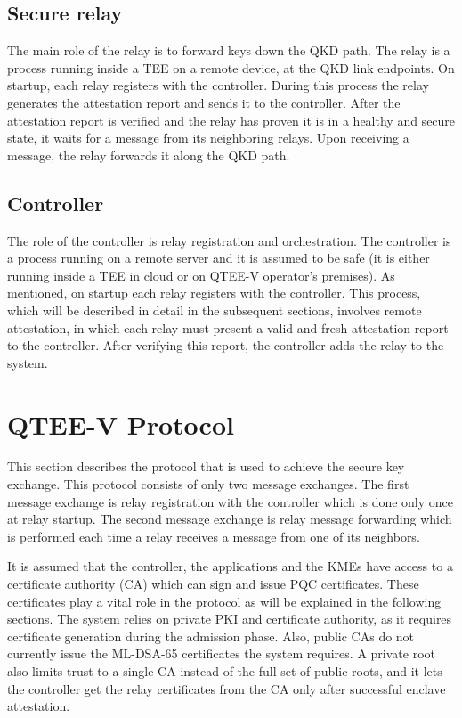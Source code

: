\documentclass[futureinternet,article,submit,moreauthors]{Definitions/mdpi}
\begin{document}
\subsection{Secure relay}

The main role of the relay is to forward keys down the QKD path. The relay is a process running inside a TEE on a remote device, at the QKD link endpoints. On startup, each relay registers with the controller. During this process the relay generates the attestation report and sends it to the controller. After the attestation report is verified and the relay has proven it is in a healthy and secure state, it waits for a message from its neighboring relays. Upon receiving a message, the relay  forwards it along the QKD path.

\subsection{Controller}

The role of the controller is relay registration and orchestration. The controller is a process running on a remote server and it is assumed to be safe (it is either running inside a TEE in cloud or on QTEE-V operator's premises). As mentioned, on startup each relay registers with the controller. This process, which will be described in detail in the subsequent sections, involves remote attestation, in which each relay must present a valid and fresh attestation report to the controller. After verifying this report, the controller adds the relay to the system.

\section{QTEE-V Protocol}

This section describes the protocol that is used to achieve the secure key exchange. This protocol consists of only two message exchanges. The first message exchange is relay registration with the controller which is done only once at relay startup. The second message exchange is relay message forwarding which is performed each time a relay receives a message from one of its neighbors.

It is assumed that the controller, the applications and the KMEs have access to a certificate authority (CA) which can sign and issue PQC certificates. These certificates play a vital role in the protocol as will be explained in the following sections. The system relies on private PKI and certificate authority, as it requires certificate generation during the admission phase. Also, public CAs do not currently issue the ML-DSA-65 certificates the system requires. A private root also limits trust to a single CA instead of the full set of public roots, and it lets the controller get the relay certificates from the CA only after successful enclave attestation.
\end{document}
